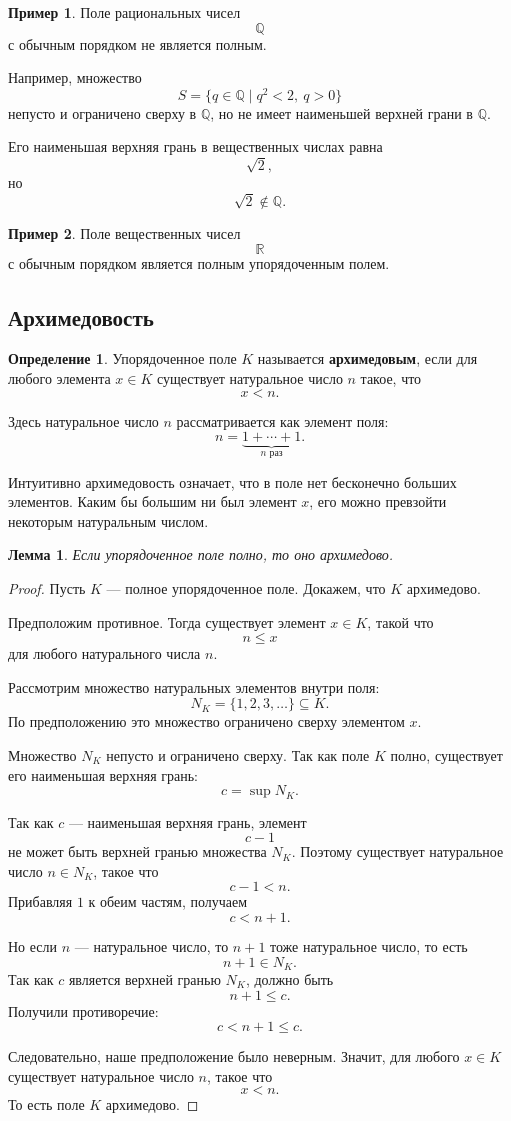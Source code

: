 \documentclass[12pt,a4paper,oneside,openany]{book}
\theoremstyle{definition}
\newtheorem{definition}{Определение}[chapter]
\newtheorem{example}{Пример}[chapter]
\theoremstyle{plain}
\newtheorem{lemma}{Лемма}[chapter]
\theoremstyle{remark}
\begin{document}
\begin{example}
Поле рациональных чисел
\[
\mathbb Q
\]
с обычным порядком не является полным.

Например, множество
\[
S=\{q\in\mathbb Q\mid q^2<2,\ q>0\}
\]
непусто и ограничено сверху в $\mathbb Q$, но не имеет наименьшей верхней грани в $\mathbb Q$.

Его наименьшая верхняя грань в вещественных числах равна
\[
\sqrt 2,
\]
но
\[
\sqrt 2\notin\mathbb Q.
\]
\end{example}

\begin{example}
Поле вещественных чисел
\[
\mathbb R
\]
с обычным порядком является полным упорядоченным полем.
\end{example}

\subsection{Архимедовость}

\begin{definition}
Упорядоченное поле $K$ называется \textbf{архимедовым}, если для любого элемента $x\in K$ существует натуральное число $n$ такое, что
\[
x<n.
\]
\end{definition}

Здесь натуральное число $n$ рассматривается как элемент поля:
\[
n=\underbrace{1+\cdots+1}_{n\text{ раз}}.
\]

Интуитивно архимедовость означает, что в поле нет бесконечно больших элементов. Каким бы большим ни был элемент $x$, его можно превзойти некоторым натуральным числом.

\begin{lemma}
Если упорядоченное поле полно, то оно архимедово.
\end{lemma}

\begin{proof}
Пусть $K$ — полное упорядоченное поле. Докажем, что $K$ архимедово.

Предположим противное. Тогда существует элемент $x\in K$, такой что
\[
n\le x
\]
для любого натурального числа $n$.

Рассмотрим множество натуральных элементов внутри поля:
\[
N_K=\{1,2,3,\ldots\}\subseteq K.
\]
По предположению это множество ограничено сверху элементом $x$.

Множество $N_K$ непусто и ограничено сверху. Так как поле $K$ полно, существует его наименьшая верхняя грань:
\[
c=\sup N_K.
\]

Так как $c$ — наименьшая верхняя грань, элемент
\[
c-1
\]
не может быть верхней гранью множества $N_K$. Поэтому существует натуральное число $n\in N_K$, такое что
\[
c-1<n.
\]
Прибавляя $1$ к обеим частям, получаем
\[
c<n+1.
\]

Но если $n$ — натуральное число, то $n+1$ тоже натуральное число, то есть
\[
n+1\in N_K.
\]
Так как $c$ является верхней гранью $N_K$, должно быть
\[
n+1\le c.
\]
Получили противоречие:
\[
c<n+1\le c.
\]

Следовательно, наше предположение было неверным. Значит, для любого $x\in K$ существует натуральное число $n$, такое что
\[
x<n.
\]
То есть поле $K$ архимедово.
\end{proof}
\end{document}
